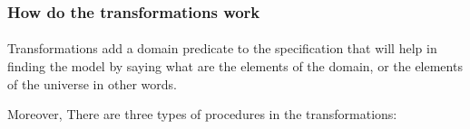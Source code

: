 	 \subsubsection{How do the transformations work}
	 
		\paragraph{} 
		Transformations add a domain predicate to the specification that will help in finding the model by saying what are the elements of the domain, or the elements of the universe in other words.\par
		Moreover, There are three types of procedures in the transformations:	
		
